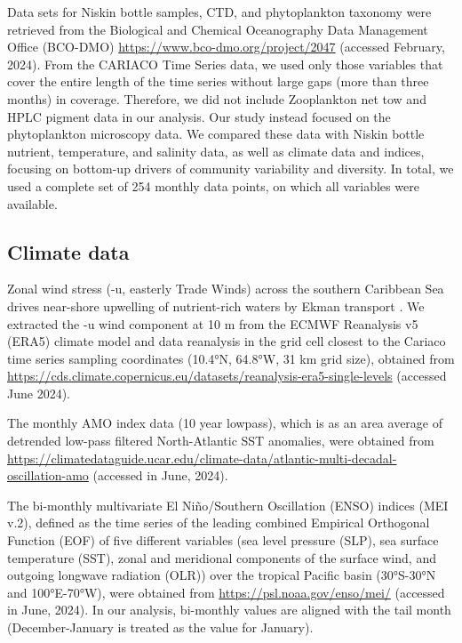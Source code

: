 \documentclass[draft]{agujournal2019}
\begin{document}
    
    Data sets for Niskin bottle samples, CTD, and phytoplankton taxonomy were retrieved from the Biological and Chemical Oceanography Data Management Office (BCO-DMO) \url{https://www.bco-dmo.org/project/2047} (accessed February, 2024). 
    From the CARIACO Time Series data, we used only those variables that cover the entire length of the time series without large gaps (more than three months) in coverage. Therefore, we did not include Zooplankton net tow and HPLC pigment data in our analysis. Our study instead focused on the phytoplankton microscopy data. We compared these data with Niskin bottle nutrient, temperature, and salinity data, as well as climate data and indices, focusing on bottom-up drivers of community variability and diversity. In total, we used a complete set of 254 monthly data points, on which all variables were available.


\subsection{Climate data}
    Zonal wind stress (-u, easterly Trade Winds) across the southern Caribbean Sea drives near-shore upwelling of nutrient-rich waters by Ekman transport \cite{taylor_ecosystem_2012}. We extracted the -u wind component at 10 m from the ECMWF Reanalysis v5 (ERA5) climate model and data reanalysis in the grid cell closest to the Cariaco time series sampling coordinates (\ang{10.4}N, \ang{64.8}W, 31 km grid size), obtained from \url{https://cds.climate.copernicus.eu/datasets/reanalysis-era5-single-levels} (accessed June 2024).
    
    The monthly AMO index data (10 year lowpass), which is as an area average of detrended low-pass filtered North-Atlantic SST anomalies, were obtained from \url{https://climatedataguide.ucar.edu/climate-data/atlantic-multi-decadal-oscillation-amo} (accessed in June, 2024). 
    
    The bi-monthly multivariate El Niño/Southern Oscillation (ENSO) indices (MEI v.2), defined as the time series of the leading combined Empirical Orthogonal Function (EOF) of five different variables (sea level pressure (SLP), sea surface temperature (SST), zonal and meridional components of the surface wind, and outgoing longwave radiation (OLR)) over the tropical Pacific basin (\ang{30}S-\ang{30}N and \ang{100}E-\ang{70}W), were obtained from \url{https://psl.noaa.gov/enso/mei/} (accessed in June, 2024). In our analysis, bi-monthly values are aligned with the tail month (December-January is treated as the value for January).
    
\end{document}
